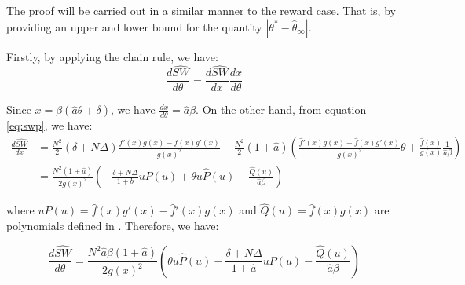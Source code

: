 \documentclass{article}
\begin{document}
The proof will be carried out in a similar manner to the reward case. That is, by providing an upper and lower bound for the quantity $|\theta^* - \hat{\theta}_{\infty}|$.

Firstly, by applying the chain rule, we have:
\[
\frac{d\widehat{SW}}{d\theta} = \frac{d\widehat{SW}}{dx} \frac{dx}{d\theta}
\]

Since $x = \beta(\hat{a}\theta + \delta)$, we have $\frac{dx}{d\theta} = \hat{a}\beta$. On the other hand, from equation \ref{eq:swp}, we have:
\begin{align*}
    \frac{d\widehat{SW}}{dx} &= \frac{N^2}{2} (\delta + N\Delta) \frac{f'(x)g(x) - f(x)g'(x)}{g(x)^2} - \frac{N^2}{2} (1+\hat{a}) \left( \frac{\hat{f}'(x)g(x) - \hat{f}(x)g'(x)}{g(x)^2} \theta + \frac{\hat{f}(x)}{g(x)} \frac{1}{\hat{a}\beta} \right) \\
    &= \frac{N^2(1+\hat{a})}{2g(x)^2} \left( - \frac{\delta + N\Delta}{1+b}uP(u) + \theta u \hat{P}(u) - \frac{\hat{Q}(u)}{\hat{a}\beta} \right)
\end{align*}

where $u\hat{P}(u) = \hat{f}(x)g'(x) - \hat{f}'(x)g(x)$ and $\hat{Q}(u) = \hat{f}(x)g(x)$ are polynomials defined in \cite{duonghan2021cost}. Therefore, we have:

\begin{equation}
\frac{d\widehat{SW}}{d\theta} = \frac{N^2 \hat{a} \beta (1+\hat{a})}{2g(x)^2} \left( \theta u \hat{P}(u) - \frac{\delta + N\Delta}{1+\hat{a}}uP(u)  - \frac{\hat{Q}(u)}{\hat{a}\beta} \right) \label{eq:swp_derivative}
\end{equation}
\end{document}
